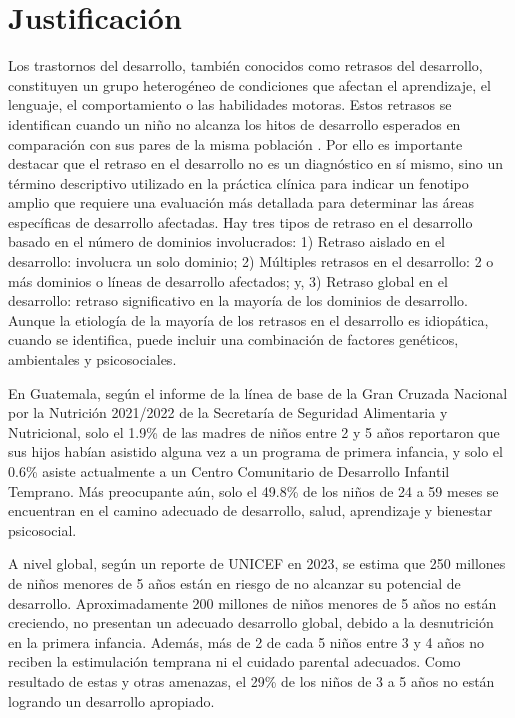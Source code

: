 \documentclass[11pt,letterpaper]{report}
\begin{document}
	\chapter{Justificación}
Los trastornos del desarrollo, también conocidos como retrasos del desarrollo,
constituyen un grupo heterogéneo de condiciones que afectan el aprendizaje, el
lenguaje, el comportamiento o las habilidades motoras.
\cite{cdcDevelopmentalDisability} Estos retrasos se identifican cuando un niño
no alcanza los hitos de desarrollo esperados en comparación con sus pares de la
misma población \cite{DevelopmentalSurveillance}. Por ello es importante
destacar que el retraso en el desarrollo no es un diagnóstico en sí mismo, sino
un término descriptivo utilizado en la práctica clínica para indicar un
fenotipo amplio que requiere una evaluación más detallada para determinar las
áreas específicas de desarrollo afectadas. Hay tres tipos de retraso en el
desarrollo basado en el número de dominios involucrados: 1) Retraso aislado en
el desarrollo: involucra un solo dominio; 2) Múltiples retrasos en el
desarrollo: 2 o más dominios o líneas de desarrollo afectados; y, 3) Retraso
global en el desarrollo: retraso significativo en la mayoría de los dominios de
desarrollo. \cite{Bellman2013} Aunque la etiología de la mayoría de los
retrasos en el desarrollo es idiopática, cuando se identifica, puede incluir
una combinación de factores genéticos, ambientales y psicosociales.
\cite{DevelopmentalDelay}

En Guatemala, según el informe de la línea de base de la Gran Cruzada Nacional
por la Nutrición 2021/2022 de la Secretaría de Seguridad Alimentaria y
Nutricional, solo el 1.9\% de las madres de niños entre 2 y 5 años reportaron
que sus hijos habían asistido alguna vez a un programa de primera infancia, y
solo el 0.6\% asiste actualmente a un Centro Comunitario de Desarrollo Infantil
Temprano. Más preocupante aún, solo el 49.8\% de los niños de 24 a 59 meses se
encuentran en el camino adecuado de desarrollo, salud, aprendizaje y bienestar
psicosocial. \cite{SESAN2022}

A nivel global, según un reporte de UNICEF en 2023, se estima que 250 millones
de niños menores de 5 años están en riesgo de no alcanzar su potencial de
desarrollo. Aproximadamente 200 millones de niños menores de 5 años no están
creciendo, no presentan un adecuado desarrollo global, debido a la desnutrición
en la primera infancia. Además, más de 2 de cada 5 niños entre 3 y 4 años no
reciben la estimulación temprana ni el cuidado parental adecuados. Como
resultado de estas y otras amenazas, el 29\% de los niños de 3 a 5 años no
están logrando un desarrollo apropiado. \cite{UNICEF2023}
\end{document}
